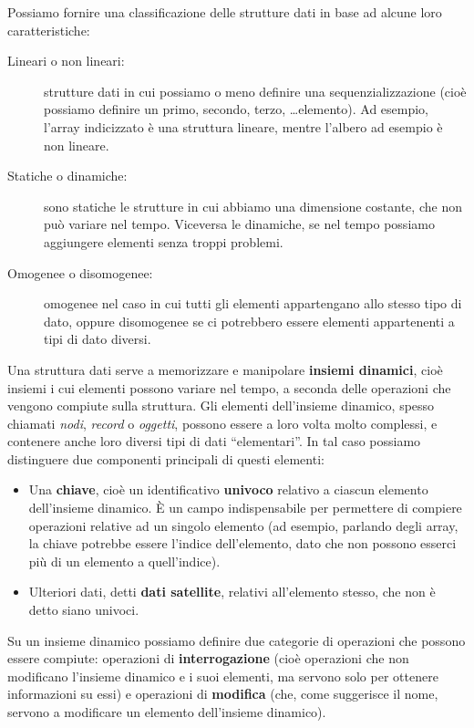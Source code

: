 \documentclass[12pt]{report}
\begin{document}
    Possiamo fornire una classificazione delle strutture dati in base ad alcune loro caratteristiche:
    \begin{description}
    	\item[Lineari o non lineari:] strutture dati in cui possiamo o meno definire una sequenzializzazione (cioè possiamo definire un primo, secondo, terzo, \dots elemento). Ad esempio, l'array indicizzato è una struttura lineare, mentre l'albero ad esempio è non lineare.
    	\item[Statiche o dinamiche:] sono statiche le strutture in cui abbiamo una dimensione costante, che non può variare nel tempo. Viceversa le dinamiche, se nel tempo possiamo aggiungere elementi senza troppi problemi.
    	\item[Omogenee o disomogenee:] omogenee nel caso in cui tutti gli elementi appartengano allo stesso tipo di dato, oppure disomogenee se ci potrebbero essere elementi appartenenti a tipi di dato diversi.
    \end{description}
    
    Una struttura dati serve a memorizzare e manipolare \textbf{insiemi dinamici}, cioè insiemi i cui elementi possono variare nel tempo, a seconda delle operazioni che vengono compiute sulla struttura.
    Gli elementi dell'insieme dinamico, spesso chiamati \textit{nodi}, \textit{record} o \textit{oggetti}, possono essere a loro volta molto complessi, e contenere anche loro diversi tipi di dati ``elementari''. In tal caso possiamo distinguere due componenti principali di questi elementi:
    \begin{itemize}
    	\item Una \textbf{chiave}, cioè un identificativo \textbf{univoco} relativo a ciascun elemento dell'insieme dinamico. È un campo indispensabile per permettere di compiere operazioni relative ad un singolo elemento (ad esempio, parlando degli array, la chiave potrebbe essere l'indice dell'elemento, dato che non possono esserci più di un elemento a quell'indice).
    	\item Ulteriori dati, detti \textbf{dati satellite}, relativi all'elemento stesso, che non è detto siano univoci.
    \end{itemize}
    
    Su un insieme dinamico possiamo definire due categorie di operazioni che possono essere compiute: operazioni di \textbf{interrogazione} (cioè operazioni che non modificano l'insieme dinamico e i suoi elementi, ma servono solo per ottenere informazioni su essi) e operazioni di \textbf{modifica} (che, come suggerisce il nome, servono a modificare un elemento dell'insieme dinamico).
    
\end{document}
